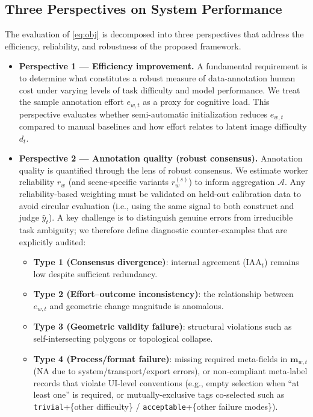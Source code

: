\subsection{Three Perspectives on System Performance}
\label{sec:dimensions}

The evaluation of \eqref{eq:obj} is decomposed into three perspectives that address the efficiency, reliability, and robustness of the proposed framework.

\begin{itemize}
  \item \textbf{Perspective 1 --- Efficiency improvement.}
  A fundamental requirement is to determine what constitutes a robust measure of data-annotation human cost
  under varying levels of task difficulty and model performance. We treat the sample annotation effort
  $e_{w,t}$ as a proxy for cognitive load. This perspective evaluates whether semi-automatic initialization
  reduces $e_{w,t}$ compared to manual baselines and how effort relates to latent image difficulty $d_t$.

  \item \textbf{Perspective 2 --- Annotation quality (robust consensus).}
  Annotation quality is quantified through the lens of robust consensus. We estimate worker reliability
  $r_w$ (and scene-specific variants $r_w^{(s)}$) to inform aggregation $\mathcal{A}$.
  Any reliability-based weighting must be validated on held-out calibration data to avoid circular evaluation
  (i.e., using the same signal to both construct and judge $\hat{y}_t$).
  A key challenge is to distinguish genuine errors from irreducible task ambiguity; we therefore define
  diagnostic counter-examples that are explicitly audited:
  \begin{itemize}
    \item \textbf{Type 1 (Consensus divergence)}: internal agreement ($\mathrm{IAA}_t$) remains low despite sufficient redundancy.
    \item \textbf{Type 2 (Effort--outcome inconsistency)}: the relationship between $e_{w,t}$ and geometric change magnitude is anomalous.
    \item \textbf{Type 3 (Geometric validity failure)}: structural violations such as self-intersecting polygons or topological collapse.
    \item \textbf{Type 4 (Process/format failure)}: missing required meta-fields in $\mathbf{m}_{w,t}$ (NA due to system/transport/export errors), or non-compliant meta-label records that violate UI-level conventions (e.g., empty selection when ``at least one'' is required, or mutually-exclusive tags co-selected such as \texttt{trivial}+\{other difficulty\} / \texttt{acceptable}+\{other failure modes\}).
  \end{itemize}


\end{itemize}
